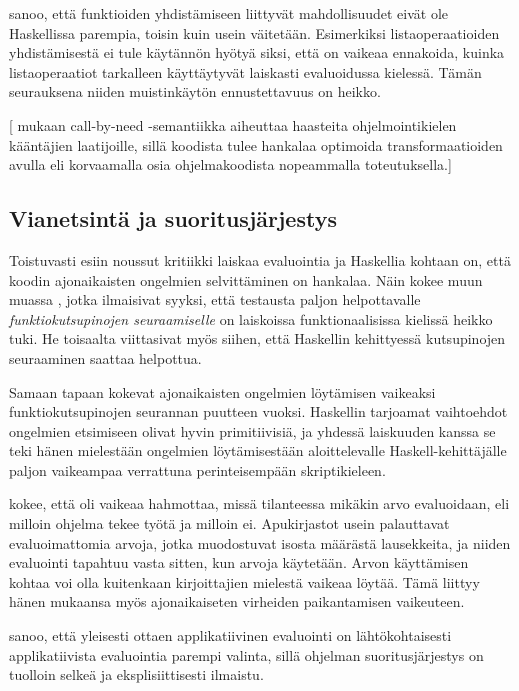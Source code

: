 \citet{vesakarvonen} sanoo, että funktioiden yhdistämiseen liittyvät mahdollisuudet eivät ole Haskellissa parempia, toisin kuin usein väitetään. Esimerkiksi listaoperaatioiden yhdistämisestä ei tule käytännön hyötyä siksi, että on vaikeaa ennakoida, kuinka listaoperaatiot tarkalleen käyttäytyvät laiskasti evaluoidussa kielessä. Tämän seurauksena niiden muistinkäytön ennustettavuus on heikko.

[\citet{moran1999improvement} mukaan call-by-need -semantiikka aiheuttaa haasteita ohjelmointikielen kääntäjien laatijoille, sillä koodista tulee hankalaa optimoida transformaatioiden avulla eli korvaamalla osia ohjelmakoodista nopeammalla toteutuksella.]

\subsection{Vianetsintä ja suoritusjärjestys}

Toistuvasti esiin noussut kritiikki laiskaa evaluointia ja Haskellia kohtaan on, että koodin ajonaikaisten ongelmien selvittäminen on hankalaa. Näin kokee muun muassa \citet{daniels2012experience}, jotka ilmaisivat syyksi, että testausta paljon helpottavalle \textit{funktiokutsupinojen seuraamiselle} on laiskoissa funktionaalisissa kielissä heikko tuki. He toisaalta viittasivat myös siihen, että Haskellin kehittyessä kutsupinojen seuraaminen saattaa helpottua.

Samaan tapaan \citet{pop2010experience} kokevat ajonaikaisten ongelmien löytämisen vaikeaksi funktiokutsupinojen seurannan puutteen vuoksi. Haskellin tarjoamat vaihtoehdot ongelmien etsimiseen olivat hyvin primitiivisiä, ja yhdessä laiskuuden kanssa se teki hänen mielestään ongelmien löytämisestään aloittelevalle Haskell-kehittäjälle paljon vaikeampaa verrattuna perinteisempään skriptikieleen.

\citet{sampson2009experience} kokee, että oli vaikeaa hahmottaa, missä tilanteessa mikäkin arvo evaluoidaan, eli milloin ohjelma tekee työtä ja milloin ei. Apukirjastot usein palauttavat evaluoimattomia arvoja, jotka muodostuvat isosta määrästä lausekkeita, ja niiden evaluointi tapahtuu vasta sitten, kun arvoja käytetään. Arvon käyttämisen kohtaa voi olla kuitenkaan kirjoittajien mielestä vaikeaa löytää. Tämä liittyy hänen mukaansa myös ajonaikaiseten virheiden paikantamisen vaikeuteen.

\citet{scott2009programming} sanoo, että yleisesti ottaen applikatiivinen evaluointi on lähtökohtaisesti applikatiivista evaluointia parempi valinta, sillä ohjelman suoritusjärjestys on tuolloin selkeä ja eksplisiittisesti ilmaistu.

